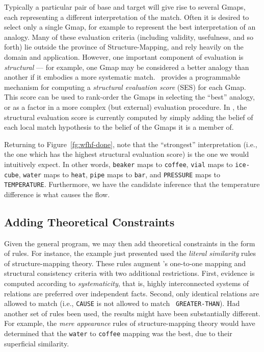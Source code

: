 Typically a particular pair of base and target will give rise to several
Gmaps, each representing a different interpretation of the match.  Often it
is desired to select only a single Gmap, for example
to represent the best interpretation of an analogy. Many of these evaluation
criteria (including validity, usefulness, and so forth) lie outside the
province of Structure-Mapping, and rely heavily on the domain and
application.  However, one important component of evaluation is {\em
structural} --- for example, one Gmap may be considered a better analogy
than another if it embodies a more systematic match.  \SME\ provides a
programmable mechanism for computing a {\em structural evaluation score}
(SES) for each Gmap.  This score can be used to rank-order the Gmaps in
selecting the ``best'' analogy, or as a factor in a more complex (but
external) evaluation procedure.  In \SMET, the structural evaluation score is
currently computed by simply adding the belief of each local match
hypothesis to the belief of the Gmaps it is a member of.

Returning to Figure~\ref{fg:wfhf-done}, note that the ``strongest''
interpretation (i.e., the one which has the highest structural evaluation
score) is the one we would intuitively expect.  In other words, {\tt beaker}
maps to {\tt coffee}, {\tt vial} maps to {\tt ice-cube}, {\tt water} maps to
{\tt heat}, {\tt pipe} maps to {\tt bar}, and {\tt PRESSURE} maps to {\tt
TEMPERATURE}.  Furthermore, we have the candidate inference that the
temperature difference is what causes the flow.

\subsection{Adding Theoretical Constraints}

Given the general program, we may then add theoretical constraints in the
form of rules. For instance, the example just presented used the {\it
literal similarity} rules of structure-mapping theory. These rules augment
\SME's one-to-one mapping and structural consistency criteria with two
additional restrictions. First, evidence is computed according to {\it
systematicity}, that is, highly interconnected systems of relations are
preferred over independent facts. Second, only identical relations are
allowed to match (i.e., {\tt CAUSE} is not allowed to match {\tt
GREATER-THAN}).  Had another set of rules been used, the results might have
been substantially different.  For example, the {\it mere appearance} rules
of structure-mapping theory would have determined that the {\tt water} to
{\tt coffee} mapping was the best, due to their superficial similarity.


